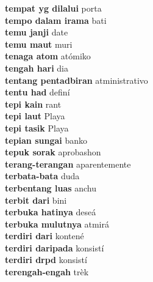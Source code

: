 \textbf{ tempat yg dilalui  } porta \\
\textbf{ tempo dalam irama  } bati \\
\textbf{ temu janji  } date \\
\textbf{ temu maut  } muri \\
\textbf{ tenaga atom  } atómiko \\
\textbf{ tengah hari  } dia \\
\textbf{ tentang pentadbiran  } atministrativo \\
\textbf{ tentu had  } definí \\
\textbf{ tepi kain  } rant \\
\textbf{ tepi laut  } Playa \\
\textbf{ tepi tasik  } Playa \\
\textbf{ tepian sungai  } banko \\
\textbf{ tepuk sorak  } aprobashon \\
\textbf{ terang-terangan  } aparentemente \\
\textbf{ terbata-bata  } duda \\
\textbf{ terbentang luas  } anchu \\
\textbf{ terbit dari  } bini \\
\textbf{ terbuka hatinya  } deseá \\
\textbf{ terbuka mulutnya  } atmirá \\
\textbf{ terdiri dari  } kontené \\
\textbf{ terdiri daripada  } konsistí \\
\textbf{ terdiri drpd  } konsistí \\
\textbf{ terengah-engah  } trèk \\
